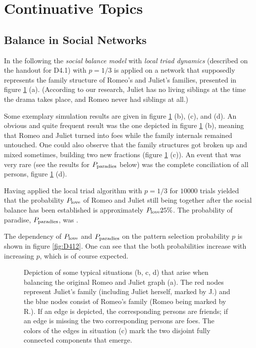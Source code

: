 \documentclass{scrartcl}
\begin{document}
\clearpage
\setcounter{section}{3}
\section{Continuative Topics}
\subsection{Balance in Social Networks}
In the following the \emph{social balance model} with \emph{local triad
dynamics} (described on the handout for D4.1) with $p = 1/3$ is applied on
a network that supposedly represents the family structure of Romeo's and
Juliet's families, presented in figure \ref{fig:D41} (a).  (According to
our research, Juliet has no living siblings at the time the drama takes
place, and Romeo never had siblings at all.)

Some exemplary simulation results are given in figure \ref{fig:D41} (b),
(c), and (d).
An obvious and quite frequent result was the one depicted in figure \ref{fig:D41}
(b), meaning that Romeo and Juliet turned into foes while the family
internals remained untouched.  One could also observe that the family
structures got broken up and mixed sometimes, building two new fractions
(figure \ref{fig:D41} (c)). An event that was very rare (see the results for
$P_{\mathrm{paradies}}$ below) was the complete conciliation of all persons,
figure \ref{fig:D41} (d).

Having applied the local triad algorithm with $p = 1/3$ for $10000$ trials
yielded that the probability $P_{\mathrm{love}}$ of Romeo and Juliet still being together after
the social balance has been established is approximately $P_{\mathrm{love}}25\%$.
The probability of paradise, $P_{\mathrm{paradies}}$, was .

The dependency of $P_{\mathrm{love}}$ and $P_{\mathrm{paradies}}$ on the pattern
selection probability $p$ is shown in figure \ref{fig:D412}. One can
see that the both probabilities increase with increasing $p$, which is
of course expected.





\begin{figure}
    \centering
    \def\svgwidth{0.9\textwidth}
    
    \caption{Depiction of some typical situations (b, c, d) that arise when
        balancing the original Romeo and Juliet graph (a). The red nodes
        represent Juliet's family (including Juliet herself, marked by J.) and
        the blue nodes consist of Romeo's family (Romeo being marked by
        R.). If an edge is depicted, the corresponding persons are friends;
        if an edge is missing the two corresponding persons are foes. The
        colors of the edges in situation (c) mark the two disjoint fully
        connected components that emerge.}
    \label{fig:D41}
\end{figure}
\end{document}
